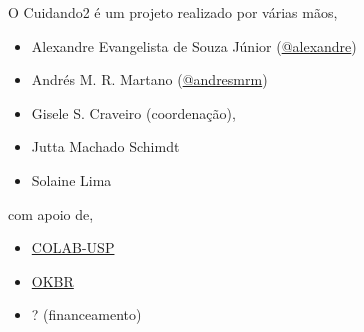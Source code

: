 \documentclass[letterpaper,10pt,portuges]{sphinxmanual}
\begin{document}
O Cuidando2 é um projeto realizado por várias mãos,
\begin{itemize}
\item {} 
Alexandre Evangelista de Souza Júnior
(\href{https://github.com/alexandre}{@alexandre})

\item {} 
Andrés M. R. Martano (\href{https://github.com/andresmrm}{@andresmrm})

\item {} 
Gisele S. Craveiro (coordenação),

\item {} 
Jutta Machado Schimdt

\item {} 
Solaine Lima

\end{itemize}

com apoio de,
\begin{itemize}
\item {} 
\href{http://colab.each.usp.br/}{COLAB-USP}

\item {} 
\href{http://br.okfn.org/}{OKBR}

\item {} 
? (financeamento)

\end{itemize}
\end{document}
